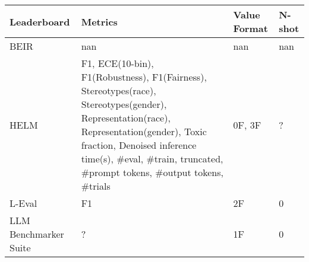 \begin{tabular}{llll}
\toprule
Leaderboard & Metrics & Value Format & N-shot \\
\midrule
BEIR & nan & nan & nan \\
HELM & F1, ECE(10-bin), F1(Robustness), F1(Fairness), Stereotypes(race), Stereotypes(gender), Representation(race), Representation(gender), Toxic fraction, Denoised inference time(s), \#eval, \#train, truncated, \#prompt tokens, \#output tokens, \#trials & 0F, 3F & ? \\
L-Eval & F1 & 2F & 0 \\
LLM Benchmarker Suite & ? & 1F & 0 \\
\bottomrule
\end{tabular}
